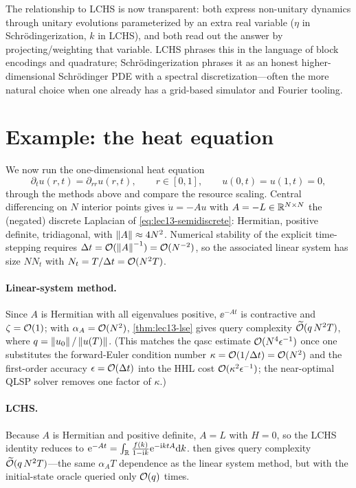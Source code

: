 The relationship to LCHS is now transparent: both express non-unitary dynamics through unitary
evolutions parameterized by an extra real variable ($\eta$ in Schr\"odingerization, $k$ in
LCHS), and both read out the answer by projecting/weighting that variable. LCHS phrases this in
the language of block encodings and quadrature; Schr\"odingerization phrases it as an honest
higher-dimensional Schr\"odinger PDE with a spectral discretization---often the more natural
choice when one already has a grid-based simulator and Fourier tooling.

\section{Example: the heat equation}
\label{sec:lec13-6}

We now run the one-dimensional heat equation
\begin{equation}
  \partial_t u(r,t)=\partial_{rr}u(r,t),\qquad r\in[0,1],\qquad u(0,t)=u(1,t)=0,
  \label{eq:lec13-heat}
\end{equation}
through the methods above and compare the resource scaling. Central differencing on $N$ interior
points gives $\dot u=-A u$ with $A=-L\in\mathbb{R}^{N\times N}$ the (negated) discrete Laplacian of
\eqref{eq:lec13-semidiscrete}: Hermitian, positive definite, tridiagonal, with $\left\lVert A \right\rVert\approx
4N^2$. Numerical stability of the explicit time-stepping requires $\Delta t=\mathcal{O}(\left\lVert A \right\rVert^{-1})
=\mathcal{O}(N^{-2})$, so the associated linear system has size $N N_t$ with $N_t=T/\Delta t=
\mathcal{O}(N^2 T)$.

\paragraph{Linear-system method.}
Since $A$ is Hermitian with all eigenvalues positive, $\ee^{-At}$ is contractive and $\zeta=
\mathcal{O}(1)$; with $\alpha_A=\mathcal{O}(N^2)$, \cref{thm:lec13-lse} gives query complexity
$\widetilde{\mathcal{O}}(q\,N^2 T)$, where $q=\left\lVert u_0 \right\rVert/\left\lVert u(T) \right\rVert$. (This matches the qasc estimate
$\mathcal{O}(N^4\epsilon^{-1})$ once one substitutes the forward-Euler condition number $\kappa=
\mathcal{O}(1/\Delta t)=\mathcal{O}(N^2)$ and the first-order accuracy $\epsilon=\mathcal{O}(\Delta t)$ into the
HHL cost $\mathcal{O}(\kappa^2\epsilon^{-1})$; the near-optimal QLSP solver removes one factor of
$\kappa$.)

\paragraph{LCHS.}
Because $A$ is Hermitian and positive definite, $A=L$ with $H=0$, so the LCHS identity reduces to
$\mathrm{e}^{-At}=\int_{\mathbb{R}}\frac{f(k)}{1-\mathrm{i} k}\mathrm{e}^{-\mathrm{i} ktA}\mathrm{d} k$.  then gives
query complexity $\widetilde{\mathcal{O}}(q\,N^2 T)$---the same $\alpha_A T$ dependence as the linear
system method, but with the initial-state oracle queried only $\mathcal{O}(q)$ times.


